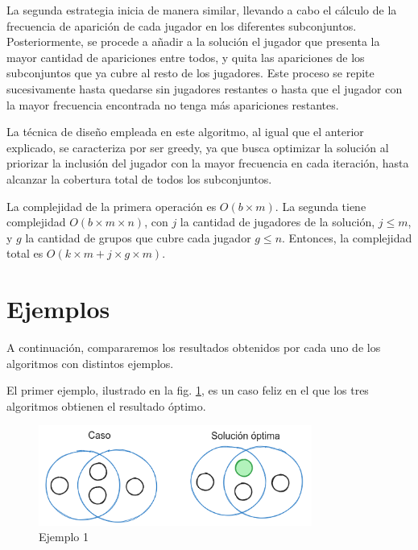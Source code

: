 La segunda estrategia inicia de manera similar, llevando a cabo el cálculo de la frecuencia de aparición de cada jugador en los diferentes subconjuntos. Posteriormente, se procede a añadir a la solución el jugador que presenta la mayor cantidad de apariciones entre todos, y quita las apariciones de los subconjuntos que ya cubre al resto de los jugadores. Este proceso se repite sucesivamente hasta quedarse sin jugadores restantes o hasta que el jugador con la mayor frecuencia encontrada no tenga más apariciones restantes.

La técnica de diseño empleada en este algoritmo, al igual que el anterior explicado, se caracteriza por ser greedy, ya que busca optimizar la solución al priorizar la inclusión del jugador con la mayor frecuencia en cada iteración, hasta alcanzar la cobertura total de todos los subconjuntos. 



La complejidad de la primera operación es $O(b \times m)$. La segunda tiene complejidad $O(b \times m \times n)$, con $j$ la cantidad de jugadores de la solución, $j \leq m$, y $g$ la cantidad de grupos que cubre cada jugador $g \leq n$. Entonces, la complejidad total es $O(k \times m + j \times g \times m)$. 

\section{Ejemplos}

A continuación, compararemos los resultados obtenidos por cada uno de los algoritmos con distintos ejemplos.

El primer ejemplo, ilustrado en la fig. \ref{fig:greedy_ej1}, es un caso feliz en el que los tres algoritmos obtienen el resultado óptimo.

\begin{figure}[H]
    \centering
    \includegraphics[width=0.8\textwidth]{img/greedy_ej1.png}
    \caption{Ejemplo 1}
    \label{fig:greedy_ej1}
\end{figure}


